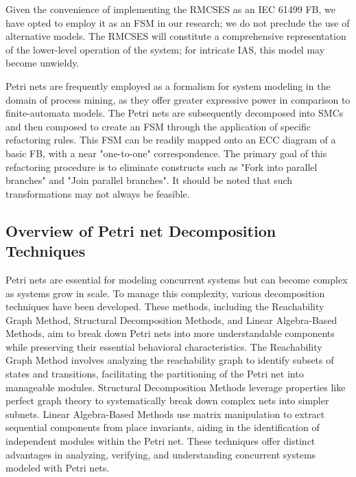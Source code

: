 \documentclass{ieeeojies}
\newcommand{\VV}[1]{\textcolor{orange}{#1}}
\begin{document}
Given the convenience of implementing the RMCSES as an IEC 61499 FB, we have opted to employ it as an FSM in our research; we do not preclude the use of alternative models. The RMCSES will constitute a comprehensive representation of the lower-level operation of the system; for intricate IAS, this model may become unwieldy.




Petri nets  \cite{van2013discovering} are frequently employed as a formalism for system modeling in the domain of process mining, as they offer greater expressive power in comparison to finite-automata models. The Petri nets are subsequently decomposed into SMCs and then composed to create an FSM through the application of specific refactoring rules. This FSM can be readily mapped onto an ECC diagram of a basic FB, with a near "one-to-one" correspondence. The primary goal of this refactoring procedure is to eliminate constructs such as "Fork into parallel branches" and "Join parallel branches". It should be noted that such transformations may not always be feasible.



\subsection{Overview of Petri net Decomposition Techniques}
\label{Petri net Decomposition}

Petri nets are essential for modeling concurrent systems \cite{liu2022petri} but can become complex as systems grow in scale. To manage this complexity, various decomposition techniques have been developed. These methods, including the Reachability Graph Method, Structural Decomposition Methods, and Linear Algebra-Based Methods, aim to break down Petri nets into more understandable components while preserving their essential behavioral characteristics. The Reachability Graph Method \cite{buchholz2002hierarchical} involves analyzing the reachability graph to identify subsets of states and transitions, facilitating the partitioning of the Petri net into manageable modules. Structural Decomposition Methods \cite{ye2017structural, hsieh2011robustness} leverage properties like perfect graph theory to systematically break down complex nets into simpler subnets. Linear Algebra-Based Methods \cite{wisniewski2019decomposition, best2013petri} use matrix manipulation to extract sequential components from place invariants, aiding in the identification of independent modules within the Petri net. These techniques offer distinct advantages in analyzing, verifying, and understanding concurrent systems modeled with Petri nets.
\end{document}
